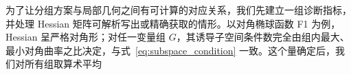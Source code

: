 为了让分组方案与局部几何之间有可计算的对应关系，我们先建立一组诊断指标，并处理 Hessian 矩阵可解析写出或精确获取的情形。以对角椭球函数 F1 为例，Hessian 呈严格对角形；对任一变量组 $G$，其诱导子空间条件数完全由组内最大、最小对角曲率之比决定，与式~\eqref{eq:subspace_condition} 一致。这个量确定后，我们对所有组取算术平均